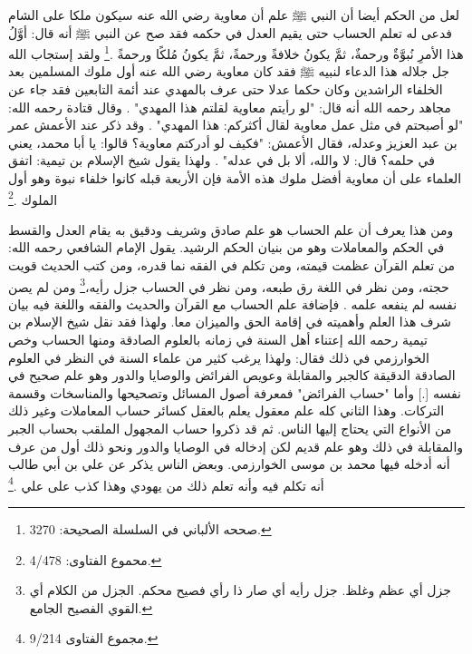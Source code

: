 لعل من الحكم أيضا أن النبي ﷺ علم أن معاوية رضي الله عنه سيكون ملكا على الشام فدعى له تعلم الحساب حتى يقيم العدل في حكمه فقد صح عن النبي ﷺ أنه قال: أوَّلُ هذا الأمرِ نُبوَّةٌ ورحمةٌ، ثمَّ يكونُ خلافةً ورحمةً، ثمَّ يكونُ مُلكًا ورحمةً \href{https://shamela.ws/book/9442/5496#p12}{\faExternalLink} \cite{albani_Sahiha}.\footnote{صححه الألباني في السلسلة الصحيحة: 3270.} ولقد إستجاب الله جل جلاله هذا الدعاء لنبيه ﷺ فقد كان معاوية رضي الله عنه أول ملوك المسلمين بعد الخلفاء الراشدين وكان حكما عدلا حتى عرف بالمهدي عند أئمة التابعين فقد جاء عن مجاهد رحمه الله أنه قال: "لو رأيتم معاوية لقلتم هذا المهدي" \href{https://shamela.ws/book/1077/702#p1}{\faExternalLink}. وقال قتادة رحمه الله: "لو أصبحتم في مثل عمل معاوية لقال أكثركم: هذا المهدي" \href{https://shamela.ws/book/1077/701#p1}{\faExternalLink}. وقد ذكر عند الأعمش عمر بن عبد العزيز وعدله، فقال الأعمش: "فكيف لو أدركتم معاوية؟ قالوا: يا أبا محمد، يعني في حلمه؟ قال: لا والله، ألا بل في عدله" \href{https://shamela.ws/book/1077/700#p1}{\faExternalLink} \href{https://shamela.ws/book/927/3063#p3}{\faExternalLink}. ولهذا يقول شيخ الإسلام بن تيمية: اتفق العلماء على أن معاوية أفضل ملوك هذه الأمة فإن الأربعة قبله كانوا خلفاء نبوة وهو أول الملوك \href{https://shamela.ws/book/7289/1800#p1}{\faExternalLink} \cite{ibnTaimia_Majmoo}.\footnote{محموع الفتاوى: 4/478.} 

ومن هذا يعرف أن علم الحساب هو علم صادق وشريف ودقيق به يقام العدل والقسط في الحكم والمعاملات وهو من بنيان الحكم الرشيد. يقول الإمام الشافعي رحمه الله: من تعلم القرآن عظمت قيمته، ومن تكلم في الفقه نما قدره، ومن كتب الحديث قويت حجته، ومن نظر في اللغة رق طبعه، ومن نظر في الحساب جزل رأيه،\footnote{جزل أي عظم وغلظ. جزل رأيه أي صار ذا رأي فصيح محكم. الجزل من الكلام أي القوي الفصيح الجامع.} ومن لم يصن نفسه لم ينفعه علمه \href{https://shamela.ws/book/22669/4471#p4}{\faExternalLink} \href{https://shamela.ws/book/10495/14224#p1}{\faExternalLink} \cite{dahabi_Siyar}. فإضافة علم الحساب مع القرآن والحديث والفقه واللغة فيه بيان شرف هذا العلم وأهميته في إقامة الحق والميزان معا. ولهذا فقد نقل شيخ الإسلام بن تيمية رحمه الله إعتناء أهل السنة في زمانه بالعلوم الصادقة ومنها الحساب وخص الخوارزمي في ذلك فقال: ولهذا يرغب كثير من علماء السنة في النظر في العلوم الصادقة الدقيقة كالجبر والمقابلة وعويص الفرائض والوصايا والدور وهو علم صحيح في نفسه [.] وأما "حساب الفرائض" فمعرفة أصول المسائل وتصحيحها والمناسخات وقسمة التركات. وهذا الثاني كله علم معقول يعلم بالعقل كسائر حساب المعاملات وغير ذلك من الأنواع التي يحتاج إليها الناس. ثم قد ذكروا حساب المجهول الملقب بحساب الجبر والمقابلة في ذلك وهو علم قديم لكن إدخاله في الوصايا والدور ونحو ذلك أول من عرف أنه أدخله فيها محمد بن موسى الخوارزمي. وبعض الناس يذكر عن علي بن أبي طالب أنه تكلم فيه وأنه تعلم ذلك من يهودي وهذا كذب على علي
\href{https://shamela.ws/book/7289/4478#p2}{\faExternalLink} \cite{ibnTaimia_Majmoo}.\footnote{مجموع الفتاوى 9/214.} 

